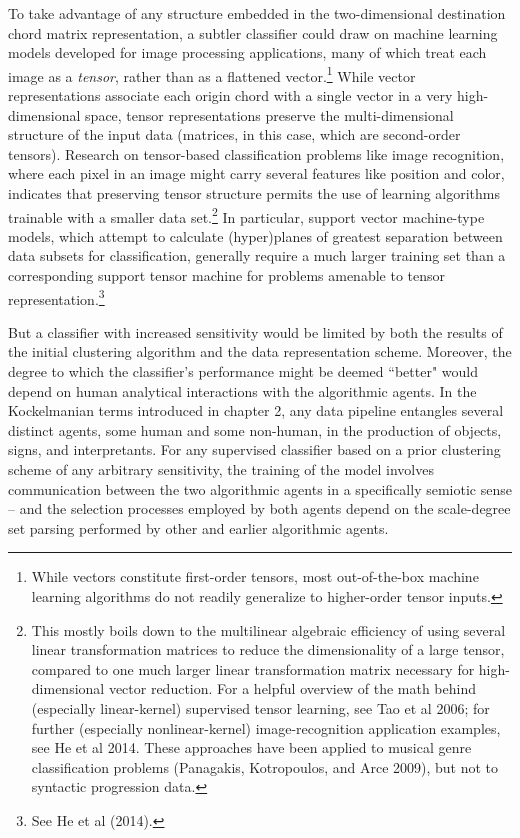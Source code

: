 To take advantage of any structure embedded in the two-dimensional destination chord matrix representation, a subtler classifier could draw on machine learning models developed for image processing applications, many of which treat each image as a \emph{tensor}, rather than as a flattened vector.\footnote{While vectors constitute first-order tensors, most out-of-the-box machine learning algorithms do not readily generalize to higher-order tensor inputs.}  While vector representations associate each origin chord with a single vector in a very high-dimensional space, tensor representations preserve the multi-dimensional structure of the input data (matrices, in this case, which are second-order tensors).  Research on tensor-based classification problems like image recognition, where each pixel in an image might carry several features like position and color, indicates that preserving tensor structure permits the use of learning algorithms trainable with a smaller data set.\footnote{This mostly boils down to the multilinear algebraic efficiency of using several linear transformation matrices to reduce the dimensionality of a large tensor, compared to one much larger linear transformation matrix necessary for high-dimensional vector reduction.  For a helpful overview of the math behind (especially linear-kernel) supervised tensor learning, see Tao et al 2006; for further (especially nonlinear-kernel) image-recognition application examples, see He et al 2014.  These approaches have been applied to musical genre classification problems (Panagakis, Kotropoulos, and Arce 2009), but not to syntactic progression data.}  In particular, support vector machine-type models, which attempt to calculate (hyper)planes of greatest separation between data subsets for classification, generally require a much larger training set than a corresponding support tensor machine for problems amenable to tensor representation.\footnote{See He et al (2014).}

But a classifier with increased sensitivity would be limited by both the results of the initial clustering algorithm and the data representation scheme.  Moreover, the degree to which the classifier's performance might be deemed ``better" would depend on human analytical interactions with the algorithmic agents.  In the Kockelmanian terms introduced in chapter 2, any data pipeline entangles several distinct agents, some human and some non-human, in the production of objects, signs, and interpretants.  For any supervised classifier based on a prior clustering scheme of any arbitrary sensitivity, the training of the model involves communication between the two algorithmic agents in a specifically semiotic sense -- and the selection processes employed by both agents depend on the scale-degree set parsing performed by other and earlier algorithmic agents.  

